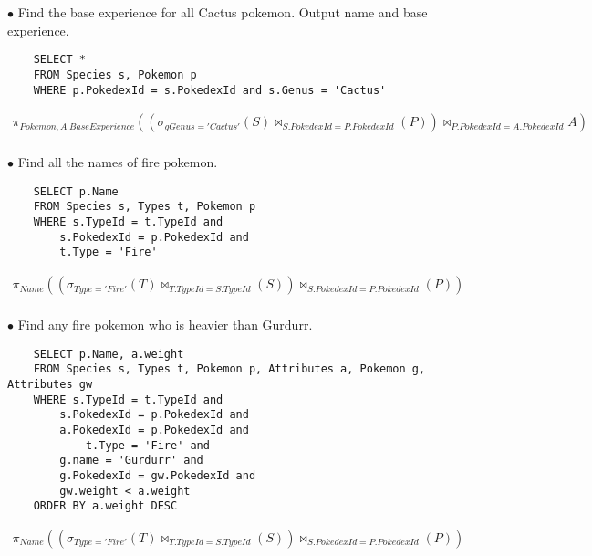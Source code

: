\documentclass[twoside]{article}
\begin{document}
$\bullet$ Find the base experience for all Cactus pokemon. Output name and base
experience.
\begin{verbatim}
    SELECT *
    FROM Species s, Pokemon p
    WHERE p.PokedexId = s.PokedexId and s.Genus = 'Cactus'
\end{verbatim}
\begin{gather*}
    \pi_{Pokemon, A.BaseExperience}((\sigma_{gGenus = 'Cactus'}(S) 
    \bowtie_{S.PokedexId = P.PokedexId}(P)) 
    \bowtie_{P.PokedexId = A.PokedexId}A) \\
\end{gather*}

$\bullet$ Find all the names of fire pokemon.
\begin{verbatim}
    SELECT p.Name
    FROM Species s, Types t, Pokemon p
    WHERE s.TypeId = t.TypeId and 
        s.PokedexId = p.PokedexId and
        t.Type = 'Fire'
\end{verbatim}
\begin{gather*}
    \pi_{Name}((\sigma_{Type = 'Fire'}(T) \bowtie_{T.TypeId = S.TypeId}(S)) 
    \bowtie_{S.PokedexId = P.PokedexId}(P)) \\
\end{gather*}

$\bullet$ Find any fire pokemon who is heavier than Gurdurr.
\begin{verbatim}
    SELECT p.Name, a.weight
    FROM Species s, Types t, Pokemon p, Attributes a, Pokemon g, Attributes gw
    WHERE s.TypeId = t.TypeId and 
        s.PokedexId = p.PokedexId and
        a.PokedexId = p.PokedexId and
            t.Type = 'Fire' and
        g.name = 'Gurdurr' and
        g.PokedexId = gw.PokedexId and
        gw.weight < a.weight
    ORDER BY a.weight DESC
\end{verbatim}
\begin{gather*}
    \pi_{Name}((\sigma_{Type = 'Fire'}(T) \bowtie_{T.TypeId = S.TypeId}(S)) 
    \bowtie_{S.PokedexId = P.PokedexId}(P)) \\
\end{gather*}

\newpage
\hfill \break
{}
\end{document}
